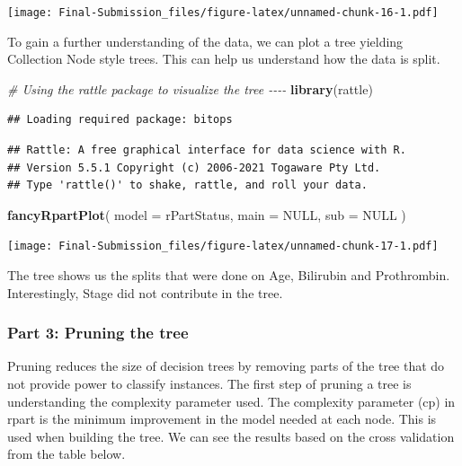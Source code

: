 \documentclass[
]{article}
\newenvironment{Shaded}{\begin{snugshade}}{\end{snugshade}}
\newcommand{\AttributeTok}[1]{\textcolor[rgb]{0.13,0.29,0.53}{#1}}
\newcommand{\CommentTok}[1]{\textcolor[rgb]{0.56,0.35,0.01}{\textit{#1}}}
\newcommand{\ConstantTok}[1]{\textcolor[rgb]{0.56,0.35,0.01}{#1}}
\newcommand{\FunctionTok}[1]{\textcolor[rgb]{0.13,0.29,0.53}{\textbf{#1}}}
\newcommand{\NormalTok}[1]{#1}
\begin{document}
\texttt{[image: Final-Submission\_files/figure-latex/unnamed-chunk-16-1.pdf]}

To gain a further understanding of the data, we can plot a tree yielding
Collection Node style trees. This can help us understand how the data is
split.

\begin{Shaded}
\begin{Highlighting}[]
\CommentTok{\# Using the rattle package to visualize the tree {-}{-}{-}{-}}
\FunctionTok{library}\NormalTok{(rattle)}
\end{Highlighting}
\end{Shaded}

\begin{verbatim}
## Loading required package: bitops
\end{verbatim}

\begin{verbatim}
## Rattle: A free graphical interface for data science with R.
## Version 5.5.1 Copyright (c) 2006-2021 Togaware Pty Ltd.
## Type 'rattle()' to shake, rattle, and roll your data.
\end{verbatim}

\begin{Shaded}
\begin{Highlighting}[]
\FunctionTok{fancyRpartPlot}\NormalTok{(}
  \AttributeTok{model =}\NormalTok{ rPartStatus,}
  \AttributeTok{main =} \ConstantTok{NULL}\NormalTok{,}
  \AttributeTok{sub =} \ConstantTok{NULL}
\NormalTok{)}
\end{Highlighting}
\end{Shaded}

\texttt{[image: Final-Submission\_files/figure-latex/unnamed-chunk-17-1.pdf]}

The tree shows us the splits that were done on Age, Bilirubin and
Prothrombin. Interestingly, Stage did not contribute in the tree.

\hypertarget{part-3-pruning-the-tree}{%
\subsubsection{Part 3: Pruning the tree}\label{part-3-pruning-the-tree}}

Pruning reduces the size of decision trees by removing parts of the tree
that do not provide power to classify instances. The first step of
pruning a tree is understanding the complexity parameter used. The
complexity parameter (cp) in rpart is the minimum improvement in the
model needed at each node. This is used when building the tree. We can
see the results based on the cross validation from the table below.
\end{document}
